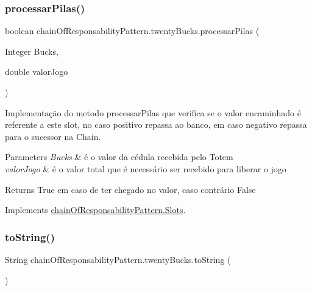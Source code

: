 \subsubsection{\texorpdfstring{processarPilas()}{processarPilas()}}
{\footnotesize\ttfamily boolean chain\+Of\+Responsability\+Pattern.\+twenty\+Bucks.\+processar\+Pilas (\begin{DoxyParamCaption}\item[{Integer}]{Bucks,  }\item[{double}]{valor\+Jogo }\end{DoxyParamCaption})}



Implementação do metodo processar\+Pilas que verifica se o valor encaminhado é referente a este slot, no caso positivo repassa ao banco, em caso negativo repassa para o sucessor na Chain. 


\begin{DoxyParams}{Parameters}
{\em Bucks} & é o valor da cédula recebida pelo Totem \\
\hline
{\em valor\+Jogo} & é o valor total que é necessário ser recebido para liberar o jogo \\
\hline
\end{DoxyParams}
\begin{DoxyReturn}{Returns}
True em caso de ter chegado no valor, caso contrário False 
\end{DoxyReturn}


Implements \mbox{\hyperlink{interfacechain_of_responsability_pattern_1_1_slots_ade54039583c4faf4126847fe7c143862}{chain\+Of\+Responsability\+Pattern.\+Slots}}.

\mbox{\label{classchain_of_responsability_pattern_1_1twenty_bucks_aabe3736a8831bab766e179c4b38b4c4c}} 
\subsubsection{\texorpdfstring{toString()}{toString()}}
{\footnotesize\ttfamily String chain\+Of\+Responsability\+Pattern.\+twenty\+Bucks.\+to\+String (\begin{DoxyParamCaption}{ }\end{DoxyParamCaption})}



